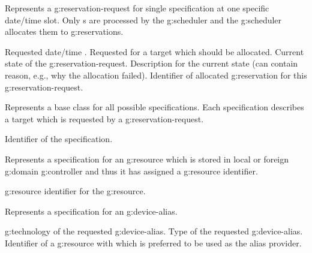 \begin{Api}
Represents a \gls{g:reservation-request} for single specification at one specific date/time slot.
Only s are processed by the \gls{g:scheduler} and the \gls{g:scheduler} allocates them to \glspl{g:reservation}. 
\begin{ApiClassAttributes}
 Requested date/time .
 Requested  for a target which should be allocated.
 Current state of the \gls{g:reservation-request}.
 Description for the current state (can contain reason, e.g., why the allocation failed).
 Identifier of allocated \gls{g:reservation} for this \gls{g:reservation-request}.
\end{ApiClassAttributes}

Represents a base class for all possible specifications. Each specification describes a target which is requested by a \gls{g:reservation-request}.
\begin{ApiClassAttributes}
 Identifier of the specification.
\end{ApiClassAttributes}

Represents a specification for an \gls{g:resource} which is stored in local or foreign \gls{g:domain} \gls{g:controller} and thus it has assigned a \gls{g:resource} identifier.
\begin{ApiClassAttributes}
 \Gls{g:resource} identifier for the \gls{g:resource}.
\end{ApiClassAttributes}

Represents a specification for an \gls{g:device-alias}.
\begin{ApiClassAttributes}
 \Gls{g:technology} of the requested \gls{g:device-alias}.
 Type of the requested \gls{g:device-alias}.
 Identifier of a \gls{g:resource} with  which is preferred to be used as the alias provider.
\end{ApiClassAttributes}


\end{Api}
